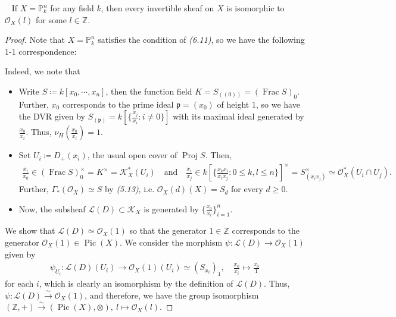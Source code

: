 \documentclass[11pt,a4paper,footinclude=true,headinclude=true]{scrbook} %
\DeclareMathOperator{\Frac}{Frac}
\DeclareMathOperator{\Proj}{Proj}
\DeclareMathOperator{\Pic}{Pic}
\DeclareMathOperator{\Cl}{Cl}
\DeclareMathOperator{\CaCl}{CaCl}
\newcommand{\KK}{\mathscr{K}}
\newcommand{\LL}{\mathscr{L}}
\newcommand{\OO}{\mathcal{O}}
\newcommand{\PP}{\mathbb{P}}
\newcommand{\pp}{\mathfrak{p}}
\newcommand{\<}{\langle}
\newcommand{\>}{\rangle}
\newcommand{\isoto}{\overset{\sim}{\to}}
\newenvironment{corollary}[2][]
{\renewcommand\theinnercustomcol{#2}\innercustomcol[#1]
\begin{mdframed}[backgroundcolor=gray!20]\ }
{\end{mdframed}\endinnercustomcol}
\begin{document}
\begin{corollary}{6.17}
    If $X=\PP_k^n$ for any field $k$, then every invertible sheaf on $X$ is isomorphic to $\OO_X(l)$ for some $l\in\mathbb{Z}$.
\end{corollary}
\begin{proof}
    Note that $X=\PP_k^n$ satisfies the condition of \textit{(6.11)}, so we have the following 1-1 correspondence:
    \begin{center}
    \end{center}
    Indeed, we note that
    \begin{itemize}
        \item[(6.4):] Write $S\coloneqq k[x_0,\cdots,x_n]$, then the function field $K=S_{((0))}=(\Frac S)_0$. Further, $x_0$ corresponds to the prime ideal $\pp=(x_0)$ of height $1$, so we have the DVR given by $S_{(\pp)}=k[\{\frac{x_j}{x_i}:i\neq0\}]$ with its maximal ideal generated by $\frac{x_0}{x_i}$. Thus, $\nu_H(\frac{x_0}{x_i})=1$.
        \item[(6.11):] Set $U_i\coloneqq D_+(x_i)$, the usual open cover of $\Proj S$. Then,
        \begin{align*}
            \frac{x_i}{x_0}\in(\Frac S)_0^\times=K^\times=\KK_X^\ast(U_i)\quad\text{and}\quad\frac{x_i}{x_j}\in k[\{\frac{x_kx_l}{x_ix_j}:0\leq k,l\leq n\}]^\times=S_{(x_ix_j)}^\times\simeq\OO_X^\ast(U_i\cap U_j).
        \end{align*}
        Further, $\Gamma_\ast(\OO_X)\simeq S$ by \textit{(5.13)}, i.e. $\OO_X(d)(X)=S_d$ for every $d\geq0$.
        \item[(6.15):] Now, the subsheaf $\LL(D)\subset\KK_X$ is generated by $\{\frac{x_0}{x_i}\}_{i=1}^n$.
    \end{itemize}
    We show that $\LL(D)\simeq\OO_X(1)$ so that the generator $1\in\mathbb{Z}$ corresponds to the generator $\OO_X(1)\in\Pic(X)$. We consider the morphism $\psi:\LL(D)\to\OO_X(1)$ given by 
    \begin{align*}
        \psi_{U_i}:\LL(D)(U_i)\longrightarrow\OO_X(1)(U_i)\simeq(S_{x_i})_1,\quad\frac{x_0}{x_i}\longmapsto\frac{x_0}{1}
    \end{align*}
    for each $i$, which is clearly an isomorphism by the definition of $\LL(D)$. Thus, $\psi:\LL(D)\isoto\OO_X(1)$, and therefore, we have the group isomorphism $(\mathbb{Z},+)\isoto(\Pic(X),\otimes),\ l\mapsto\OO_X(l)$.
\end{proof}
\end{document}
